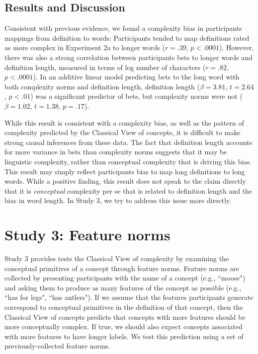 \subsection{Results and Discussion}
Consistent with previous evidence, we found a complexity bias in participants mappings from definition to words: Participants tended to map definitions rated as more complex in Experiment 2a to longer words ($r = .39$,  $p< .0001$). However, there was also a strong correlation between participants bets to longer words and definition length, measured in terms of log number of characters ($r = .82$, $p< .0001$). In an additive linear model predicting bets to the long word with both complexity norms and definition length, definition length ($\beta=3.81$, $t =2.64$, $p<.01$) was a significant predictor of bets, but complexity norms were not ($\beta=1.02$, $t =1.38$, $p=.17$). 

While this result is consistent with a complexity bias, as well as the pattern of complexity predicted by the Classical View of concepts, it is difficult to make strong causal inferences from these data. The fact that definition length accounts for more variance in bets than complexity norms suggests that it may be linguistic complexity, rather than conceptual complexity that is driving this bias. This result may simply reflect participants bias to map long definitions to long words. While a positive finding, this result does not speak to the claim directly that it is {\it conceptual} complexity per se that is related to definition length and the bias in word length. In Study 3, we try to address this issue more directly. 

\section{Study 3: Feature norms}
Study 3 provides tests the Classical View of complexity by examining the conceptual primitives of a concept through feature norms. Feature norms are collected by presenting participants with the name of a concept (e.g., ``moose") and asking them to produce as many features of the concept as possible (e.g., ``has for legs", ``has antlers"). If we assume that the features participants generate correspond to conceptual primitives in the definition of that concept, then the Classical View of concepts predicts that concepts with more  features should be more conceptually complex. If true, we should also expect concepts associated with more features to have longer labels. We test this prediction using a set of previously-collected feature norms.

